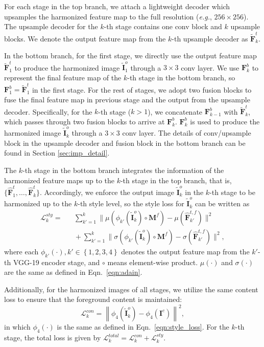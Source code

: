 \documentclass[letterpaper]{article} %
\begin{document}
For each stage in the top branch, we attach a lightweight decoder which upsamples the harmonized feature map to the full resolution (\emph{e.g.}, $256\times 256$). The upsample decoder for the $k$-th stage contains one conv block and $k$ upsample blocks. We denote the output feature map from the $k$-th upsample decoder as $\tilde{\bm{F}}^t_k$.  

In the bottom branch, for the first stage, we directly use the output feature map $\tilde{\bm{F}}^t_1$ to produce the harmonized image $\tilde{\bm{I}}_1^o$ through a $3\times 3 $ conv layer. We use $\bm{F}^{b}_k$ to represent the final feature map of the $k$-th stage in the bottom branch, so $\bm{F}^{b}_1=\tilde{\bm{F}}^t_1$ in the first stage.
For the rest of stages, we adopt two fusion blocks to fuse the final feature map in previous stage and the output from the upsample decoder. Specifically, for the $k$-th stage ($k>1$), we concatenate $\bm{F}^{b}_{k-1}$ with $\tilde{\bm{F}}^t_k$, which passes through two fusion blocks to arrive at $\bm{F}^{b}_k$. $\bm{F}^{b}_k$ is used to produce the harmonized image  $\tilde{\bm{I}}^o_k$ through a $3\times 3 $ conv layer. The details of conv/upsample block in the upsample decoder and fusion block in the bottom branch can be found in Section \ref{sec:imp_detail}. 


The $k$-th stage in the bottom branch integrates the information of the harmonized feature maps up to the $k$-th stage in the top branch, that is, $\{\hat{\bm{F}}^{t}_1,\ldots, \hat{\bm{F}}^{t}_k\}$. Accordingly, we enforce the output image $\tilde{\bm{I}}^o_k$ in the $k$-th stage to be harmonized up to the $k$-th style level, so the style loss \cite{huang2017arbitrary} for  $\tilde{\bm{I}}^o_k$ can be written as
\begin{eqnarray}\label{eqn:style_loss}
\mathcal{L}^{sty}_k=\!\!\!\!\!\!\!\!\!\!\!\!&&\sum_{k'=1}^{k}\|\mu\left(\phi_{k'}(\tilde{\bm{I}}^{o}_k)\circ \bm{M}^f\right)-\mu(\hat{\bm{F}}^{t,f}_{k'}) \|^2 \nonumber\\
&&\!\!\!\!\!\!\!\!\!\!\!\!+ \sum_{k'=1}^{k}\|\sigma\left(\phi_{k'}(\tilde{\bm{I}}^{o}_k)\circ \bm{M}^f\right)-\sigma(\hat{\bm{F}}^{t,f}_{k'}) \|^2, 
\end{eqnarray}
where each $\phi_{k'}(\cdot), k'\in\left\{1,2,3,4\right\}$ denotes the output feature map from the $k'$-th VGG-19 encoder stage, and $\circ$ means element-wise product. $\mu(\cdot)$ and $\sigma(\cdot)$ are the same as defined in Eqn.~\ref{eqn:adain}.

Additionally, for the harmonized images of all stages, we utilize the same content loss \cite{gatys2016image} to ensure that the foreground content is maintained:
\begin{equation}\label{eqn:content_loss}
    \mathcal{L}^{con}_k =\left\|\phi_4(\tilde{\bm{I}}^o_k)-\phi_4(\bm{I}^c)\right\|^2,
\end{equation}
in which $\phi_{4}(\cdot)$ is the same as defined in Eqn.~\ref{eqn:style_loss}.
For the $k$-th stage, the total loss is given by $\mathcal{L}^{total}_k = \mathcal{L}^{con}_k + \mathcal{L}^{sty}_k$.
\end{document}
